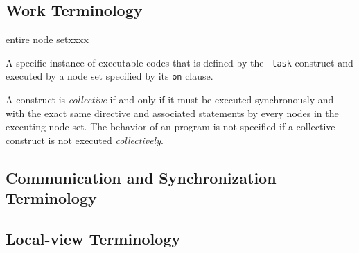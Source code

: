 \subsection{Work Terminology}

\begin{namelist}{entire node setxxxx}


A specific instance of executable codes that is defined by the {\tt
task} construct and executed by a node set specified by its {\tt on}
clause.


%


      A construct is {\it collective} if and only if it must be executed 
      synchronously and with the exact same directive and associated
      statements by every nodes in the executing node set. The behavior
      of an {\XMP} program is not specified if a collective construct is
      not executed {\it collectively}.


\end{namelist}


\subsection{Communication and Synchronization Terminology}


\subsection{Local-view Terminology}

